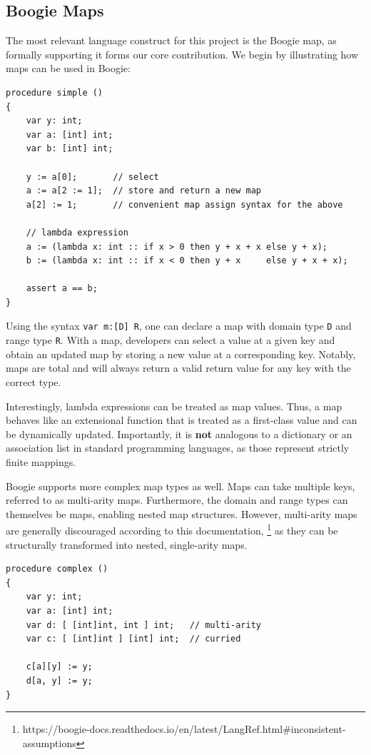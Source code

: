 \documentclass[11pt]{article}
\begin{document}
\subsection{Boogie Maps}
\label{sec:semantics-boogie-maps}

The most relevant language construct for this project is the Boogie map,
as formally supporting it forms our core contribution.
We begin by illustrating how maps can be used in Boogie:

\begin{verbatim}
procedure simple ()
{
    var y: int;
    var a: [int] int;
    var b: [int] int;
    
    y := a[0];       // select
    a := a[2 := 1];  // store and return a new map
    a[2] := 1;       // convenient map assign syntax for the above

    // lambda expression
    a := (lambda x: int :: if x > 0 then y + x + x else y + x);
    b := (lambda x: int :: if x < 0 then y + x     else y + x + x);
  
    assert a == b;
}
\end{verbatim}

Using the syntax \texttt{var m:[D] R}, one can declare a map with domain type \texttt{D} and range type \texttt{R}.
With a map, developers can select a value at a given key and obtain an updated map by storing a new value at a corresponding key.
Notably, maps are total and will always return a valid return value for any key with the correct type.

Interestingly, lambda expressions can be treated as map values.
Thus, a map behaves like an extensional function that is treated as a first-class value and can be dynamically updated.
Importantly, it is \textbf{not} analogous to a dictionary or an association list in standard programming languages, as those represent strictly finite mappings.

Boogie supports more complex map types as well.
Maps can take multiple keys, referred to as multi-arity maps.
Furthermore, the domain and range types can themselves be maps, enabling nested map structures.
However, multi-arity maps are generally discouraged according to this documentation,
\footnote{https://boogie-docs.readthedocs.io/en/latest/LangRef.html\#inconsistent-assumptions}
as they can be structurally transformed into nested, single-arity maps.

\begin{verbatim}
procedure complex ()
{
    var y: int;
    var a: [int] int;
    var d: [ [int]int, int ] int;   // multi-arity
    var c: [ [int]int ] [int] int;  // curried
    
    c[a][y] := y;
    d[a, y] := y;
}
\end{verbatim}
\end{document}
